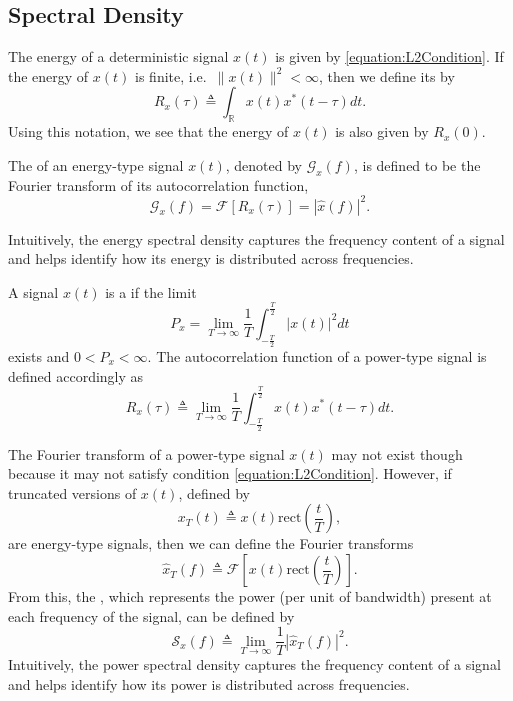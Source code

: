\subsection{Spectral Density}
\label{subsection:SpectralDensity}

The energy of a deterministic signal $x(t)$ is given by \eqref{equation:L2Condition}.
If the energy of $x(t)$ is finite, i.e.\ $\| x(t) \|^2 < \infty$, then we define its  by
\begin{equation*}
R_x(\tau) \triangleq \int_{\mathbb{R}} x(t)x^*(t - \tau) dt .
\end{equation*}
Using this notation, we see that the energy of $x(t)$ is also given by $R_x(0)$.

\begin{definition}
The  of an energy-type signal $x(t)$, denoted by $\mathcal{G}_x (f)$, is defined to be the Fourier transform of its autocorrelation function,
\begin{equation*}
\mathcal{G}_x(f) = \mathcal{F} [ R_x (\tau) ] = | \hat{x}(f) |^2.
\end{equation*}
\end{definition}
Intuitively, the energy spectral density captures the frequency content of a signal and helps identify how its energy is distributed across frequencies.

A signal $x(t)$ is a  if the limit
\[ P_x = \lim_{T\rightarrow\infty} \frac{1}{T} \int_{-\frac{T}{2}}^{\frac{T}{2}} | x(t) |^2 dt \]
exists and $0 < P_x < \infty$.
The autocorrelation function of a power-type signal is defined accordingly as
\begin{equation*}
R_x(\tau) \triangleq  \lim_{T\rightarrow\infty} \frac{1}{T} \int_{-\frac{T}{2}}^{\frac{T}{2}} x(t)x^*(t - \tau) dt .
\end{equation*}

The Fourier transform of a power-type signal $x(t)$ may not exist though because it may not satisfy condition \eqref{equation:L2Condition}.
However, if truncated versions of $x(t)$, defined by
\begin{equation*}
x_T(t) \triangleq x(t) \mathrm{rect} \left( \frac{t}{T} \right) ,
\end{equation*}
are energy-type signals, then we can define the Fourier transforms
\begin{equation*}
\hat{x}_T(f) \triangleq \mathcal{F} \left[ x(t) \mathrm{rect} \left( \frac{t}{T} \right) \right] .
\end{equation*}
From this, the , which represents the power (per unit of bandwidth) present at each frequency of the signal, can be defined by
\begin{equation*}
\mathcal{S}_x(f) \triangleq \lim_{T \rightarrow \infty} \frac{1}{T} |\hat{x}_T(f)|^2 .
\end{equation*}
Intuitively, the power spectral density captures the frequency content of a signal and helps identify how its power is distributed across frequencies.

